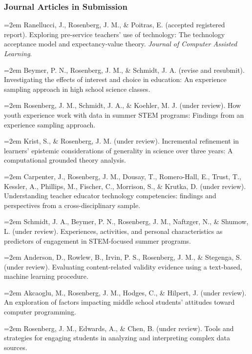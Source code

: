 \documentclass[14,]{article}
\begin{document}
\hypertarget{journal-articles-in-submission}{%
\subsubsection{Journal Articles in
Submission}\label{journal-articles-in-submission}}

\hangindent=2em Ranellucci, J., Rosenberg, J. M., \& Poitras, E.
(accepted registered report). Exploring pre-service teachers' use of
technology: The technology acceptance model and expectancy-value theory.
\emph{Journal of Computer Assisted Learning}.

\hangindent=2em Beymer, P. N., Rosenberg, J. M., \& Schmidt, J. A.
(revise and resubmit). Investigating the effects of interest and choice
in education: An experience sampling approach in high school science
classes.

\hangindent=2em Rosenberg, J. M., Schmidt, J. A., \& Koehler, M. J.
(under review). How youth experience work with data in summer STEM
programs: Findings from an experience sampling approach.

\hangindent=2em Krist, S., \& Rosenberg, J. M. (under review).
Incremental refinement in learners' epistemic considerations of
generality in science over three years: A computational grounded theory
analysis.

\hangindent=2em Carpenter, J., Rosenberg, J. M., Dousay, T.,
Romero-Hall, E., Trust, T., Kessler, A., Phillips, M., Fischer, C.,
Morrison, S., \& Krutka, D. (under review). Understanding teacher
educator technology competencies: findings and perspectives from a
cross-disciplinary sample.

\hangindent=2em Schmidt, J. A., Beymer, P. N., Rosenberg, J. M.,
Naftzger, N., \& Shumow, L. (under review). Experiences, activities, and
personal characteristics as predictors of engagement in STEM-focused
summer programs.

\hangindent=2em Anderson, D., Rowlew, B., Irvin, P. S., Rosenberg, J.
M., \& Stegenga, S. (under review). Evaluating content-related validity
evidence using a text-based, machine learning procedure.

\hangindent=2em Akcaoglu, M., Rosenberg, J. M., Hodges, C., \& Hilpert,
J. (under review). An exploration of factors impacting middle school
students' attitudes toward computer programming.

\hangindent=2em Rosenberg, J. M., Edwards, A., \& Chen, B. (under
review). Tools and strategies for engaging students in analyzing and
interpreting complex data sources.
\end{document}
